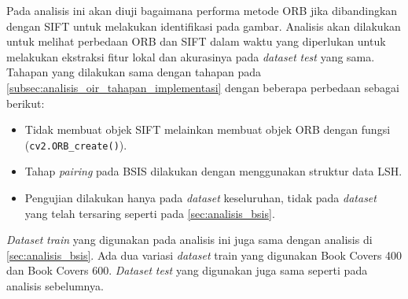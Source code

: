 Pada analisis ini akan diuji bagaimana performa metode ORB jika dibandingkan dengan SIFT untuk melakukan identifikasi pada gambar. Analisis akan dilakukan untuk melihat perbedaan ORB dan SIFT dalam waktu yang diperlukan untuk melakukan ekstraksi fitur lokal dan akurasinya pada \textit{dataset} \textit{test} yang sama. Tahapan yang dilakukan sama dengan tahapan pada \ref{subsec:analisis_oir_tahapan_implementasi} dengan beberapa perbedaan sebagai berikut:
\begin{itemize}
	\item Tidak membuat objek SIFT melainkan membuat objek ORB dengan fungsi (\texttt{cv2.ORB\_create()}).
	\item Tahap \textit{pairing} pada BSIS dilakukan dengan menggunakan struktur data LSH. 
	\item Pengujian dilakukan hanya pada \textit{dataset} keseluruhan, tidak pada \textit{dataset} yang telah tersaring seperti pada \ref{sec:analisis_bsis}.
\end{itemize}
\textit{Dataset} \textit{train} yang digunakan pada analisis ini juga sama dengan analisis di \ref{sec:analisis_bsis}. Ada dua variasi \textit{dataset} train yang digunakan Book Covers 400 dan Book Covers 600. \textit{Dataset} \textit{test} yang digunakan juga sama seperti pada analisis sebelumnya.

